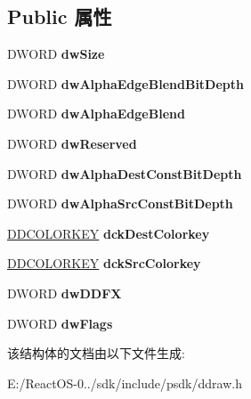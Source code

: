 \subsection*{Public 属性}
\begin{DoxyCompactItemize}
\item 
\mbox{\label{struct___d_d_o_v_e_r_l_a_y_f_x_a184462b875b02cea7f5815a6b973bb3e}} 
D\+W\+O\+RD {\bfseries dw\+Size}
\item 
\mbox{\label{struct___d_d_o_v_e_r_l_a_y_f_x_aa2cad79d14887e62056ad2003b40748a}} 
D\+W\+O\+RD {\bfseries dw\+Alpha\+Edge\+Blend\+Bit\+Depth}
\item 
\mbox{\label{struct___d_d_o_v_e_r_l_a_y_f_x_a6b148df768155550f6a11f2b0cd540ef}} 
D\+W\+O\+RD {\bfseries dw\+Alpha\+Edge\+Blend}
\item 
\mbox{\label{struct___d_d_o_v_e_r_l_a_y_f_x_a70b16ce6d4b156ed6ad0c5e480353f35}} 
D\+W\+O\+RD {\bfseries dw\+Reserved}
\item 
\mbox{\label{struct___d_d_o_v_e_r_l_a_y_f_x_ac25592dcb5ddcfd69534aa73f6505f92}} 
D\+W\+O\+RD {\bfseries dw\+Alpha\+Dest\+Const\+Bit\+Depth}
\item 
\mbox{\label{struct___d_d_o_v_e_r_l_a_y_f_x_a8651b082d6b649aed5fb23602f5cda99}} 
D\+W\+O\+RD {\bfseries dw\+Alpha\+Src\+Const\+Bit\+Depth}
\item 
\mbox{\label{struct___d_d_o_v_e_r_l_a_y_f_x_a8c6e19391229799779fffdf696373f5e}} 
\hyperlink{struct_d_d_c_o_l_o_r_k_e_y}{D\+D\+C\+O\+L\+O\+R\+K\+EY} {\bfseries dck\+Dest\+Colorkey}
\item 
\mbox{\label{struct___d_d_o_v_e_r_l_a_y_f_x_af28b2f48ff29a699dada4c3d47161363}} 
\hyperlink{struct_d_d_c_o_l_o_r_k_e_y}{D\+D\+C\+O\+L\+O\+R\+K\+EY} {\bfseries dck\+Src\+Colorkey}
\item 
\mbox{\label{struct___d_d_o_v_e_r_l_a_y_f_x_acedf1d2ef81e7a64ff3522a9c9829d09}} 
D\+W\+O\+RD {\bfseries dw\+D\+D\+FX}
\item 
\mbox{\label{struct___d_d_o_v_e_r_l_a_y_f_x_afd366df537de4e9895b09f043d133d1f}} 
D\+W\+O\+RD {\bfseries dw\+Flags}
\end{DoxyCompactItemize}


该结构体的文档由以下文件生成\+:\begin{DoxyCompactItemize}
\item 
E\+:/\+React\+O\+S-\/0../sdk/include/psdk/ddraw.\+h\end{DoxyCompactItemize}

